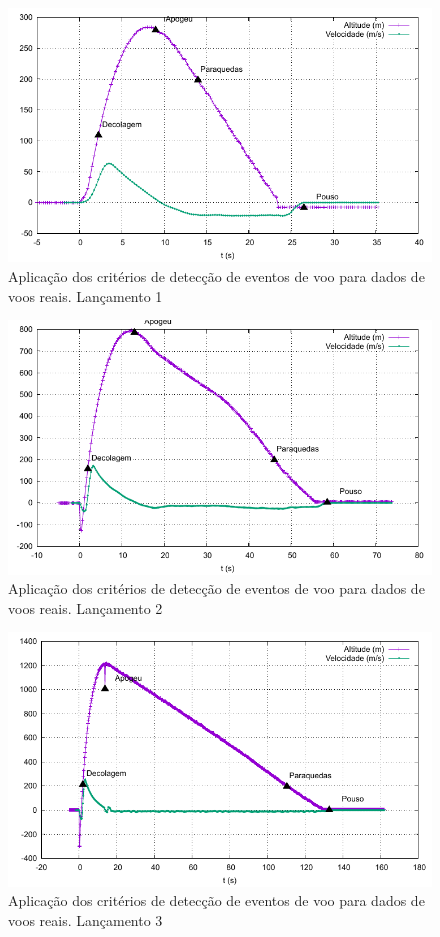 \documentclass[12pt,a4paper]{article}
\begin{document}
\begin{figure}[!ht]
	\centering
	\includegraphics[width=\textwidth]{./data/lacamentos-def-criterios/lancamento01/trajectory}
	\caption{Aplicação dos critérios de detecção de eventos de voo para dados de voos reais. Lançamento  1}
	\label{fig:lancamento01}
\end{figure}
\begin{figure}[!ht]
	\centering
	\includegraphics[width=\textwidth]{./data/lacamentos-def-criterios/lancamento02/trajectory}
	\caption{Aplicação dos critérios de detecção de eventos de voo para dados de voos reais. Lançamento  2}
	\label{fig:lancamento02}
\end{figure}
\begin{figure}[!ht]
	\centering
	\includegraphics[width=\textwidth]{./data/lacamentos-def-criterios/lancamento03/trajectory}
	\caption{Aplicação dos critérios de detecção de eventos de voo para dados de voos reais. Lançamento  3}
	\label{fig:lancamento03}
\end{figure}
\end{document}
